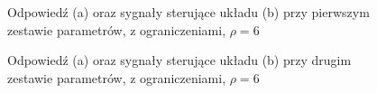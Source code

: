 \documentclass{article}
\begin{document}
\begin{figure}[H]
    \centering
    \caption{Odpowiedź (a) oraz sygnały sterujące układu (b) przy pierwszym zestawie parametrów, z ograniczeniami, $\rho=6$}
    \label{fig:1z}
\end{figure}

\begin{figure}[H]
    \centering
    \caption{Odpowiedź (a) oraz sygnały sterujące układu (b) przy drugim zestawie parametrów, z ograniczeniami, $\rho=6$}
    \label{fig:2z}
\end{figure}
\end{document}
